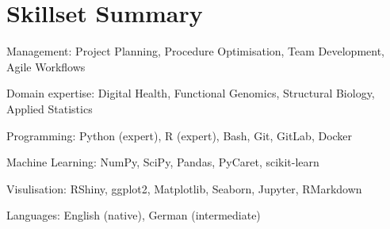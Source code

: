 \section{Skillset Summary}
\begin{itemize*}
 \item Management: Project Planning, Procedure Optimisation, Team Development, Agile Workflows
 \item Domain expertise: Digital Health, Functional Genomics, Structural Biology, Applied Statistics
 \item Programming: Python (expert), R (expert), Bash, Git, GitLab, Docker
 \item Machine Learning: NumPy, SciPy, Pandas, PyCaret, scikit-learn
 \item Visulisation: RShiny, ggplot2, Matplotlib, Seaborn, Jupyter, RMarkdown
 \item Languages: English (native), German (intermediate)
\end{itemize*}
